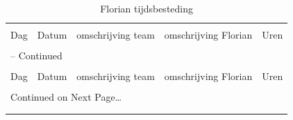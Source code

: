 \documentclass[12pt,a4paper]{report}
\begin{document}
\begin{landscape}
\begin{longtable}{llp{7cm}p{10cm}l}
\caption{Florian tijdsbesteding} \\

\hline \hline \\[-2ex]
  \multicolumn{1}{l}{Dag} & \multicolumn{1}{l}{Datum} &
  \multicolumn{1}{p{7cm}}{omschrijving team} &
  \multicolumn{1}{p{10cm}}{omschrijving Florian} &
  \multicolumn{1}{l}{Uren}  \\[0.5ex] \hline \\[-1.8ex]
\endfirsthead

\multicolumn{5}{l}{{\tablename} \thetable{} -- Continued} \\[0.5ex]
\hline \hline \\[-2ex]
  \multicolumn{1}{l}{Dag} & \multicolumn{1}{l}{Datum} &
  \multicolumn{1}{p{7cm}}{omschrijving team} &
  \multicolumn{1}{p{10cm}}{omschrijving Florian} &
  \multicolumn{1}{l}{Uren}  \\[0.5ex] \hline \\[-1.8ex]
\endhead

\multicolumn{5}{l}{{Continued on Next Page\ldots}} \\
\endfoot

\\[-1.8ex] \hline \hline
\endlastfoot


\end{longtable}
\end{landscape}
\end{document}
